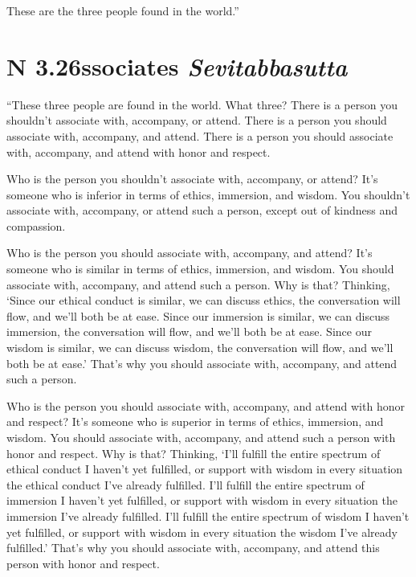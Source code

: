 \documentclass[12pt,openany]{book}%
\newcommand*{\suttatitleacronym}[1]{\smaller[2]{#1}\vspace*{.3em}}
\newcommand*{\suttatitletranslation}[1]{\linebreak{#1}}
\newcommand*{\suttatitleroot}[1]{\linebreak\smaller[2]\itshape{#1}}
\newcommand*{\tocacronym}[1]{\hspace*{-3.3em}{#1}\quad}
\newcommand*{\toctranslation}[1]{#1}
\newcommand*{\tocroot}[1]{(\textit{#1})}
\begin{document}
These are the three people found in the world.” 

%
\section*{{\suttatitleacronym AN 3.26}{\suttatitletranslation Associates }{\suttatitleroot Sevitabbasutta}}
\addcontentsline{toc}{section}{\tocacronym{AN 3.26} \toctranslation{Associates } \tocroot{Sevitabbasutta}}

“These three people are found in the world. What three? There is a person you shouldn’t associate with, accompany, or attend. There is a person you should associate with, accompany, and attend. There is a person you should associate with, accompany, and attend with honor and respect. 

Who is the person you shouldn’t associate with, accompany, or attend? It’s someone who is inferior in terms of ethics, immersion, and wisdom. You shouldn’t associate with, accompany, or attend such a person, except out of kindness and compassion. 

Who is the person you should associate with, accompany, and attend? It’s someone who is similar in terms of ethics, immersion, and wisdom. You should associate with, accompany, and attend such a person. Why is that? Thinking, ‘Since our ethical conduct is similar, we can discuss ethics, the conversation will flow, and we’ll both be at ease. Since our immersion is similar, we can discuss immersion, the conversation will flow, and we’ll both be at ease. Since our wisdom is similar, we can discuss wisdom, the conversation will flow, and we’ll both be at ease.’ That’s why you should associate with, accompany, and attend such a person. 

Who is the person you should associate with, accompany, and attend with honor and respect? It’s someone who is superior in terms of ethics, immersion, and wisdom. You should associate with, accompany, and attend such a person with honor and respect. Why is that? Thinking, ‘I’ll fulfill the entire spectrum of ethical conduct I haven’t yet fulfilled, or support with wisdom in every situation the ethical conduct I’ve already fulfilled. I’ll fulfill the entire spectrum of immersion I haven’t yet fulfilled, or support with wisdom in every situation the immersion I’ve already fulfilled. I’ll fulfill the entire spectrum of wisdom I haven’t yet fulfilled, or support with wisdom in every situation the wisdom I’ve already fulfilled.’ That’s why you should associate with, accompany, and attend this person with honor and respect. 
\end{document}
